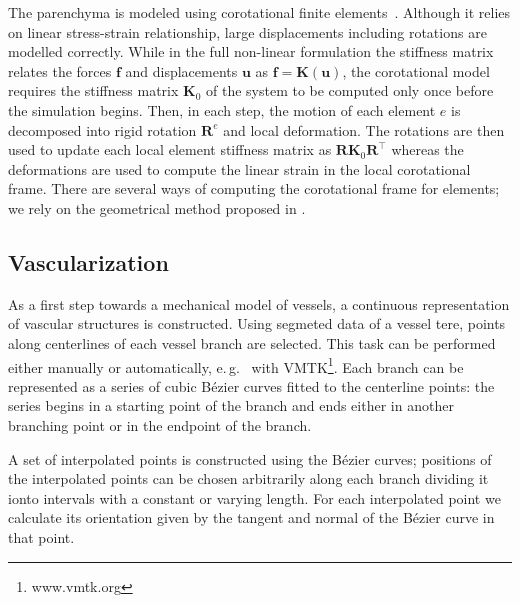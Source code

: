\documentclass[final,3p,times,twocolumn]{elsarticle}
\def\eg{e.\,g.\ }
\renewcommand{\Vec}[1]{\boldsymbol{#1}}
\newcommand{\Mat}[1]{\boldsymbol{#1}}
\begin{document}
The parenchyma is modeled using corotational finite elements~\cite{Felippa2005}.
Although it relies on linear stress-strain relationship, large displacements including rotations are modelled correctly. 
While in the full non-linear formulation the stiffness matrix relates the forces $\Vec{f}$ and 
displacements $\Vec{u}$ as $\Vec{f} = \Mat{K}(\Vec{u})$, the corotational model 
requires the stiffness matrix $\Mat{K}_0$ of the system to be computed only once before the simulation begins. 
Then, in each step, the motion of each element $e$ is decomposed into rigid rotation $\Mat{R}^e$ and local deformation. 
The rotations are then used to update each local element stiffness matrix as $\Mat{R}\Mat{K}_0\Mat{R}^{\top}$
whereas the deformations are used to compute the linear strain in the local corotational frame.
There are several ways of computing the corotational frame for elements; we rely on
the geometrical method proposed in \cite{Nesme2005}.


\subsection{Vascularization} %

As a first step towards a mechanical model of vessels, a continuous
representation of vascular structures is constructed. Using segmeted data
of a vessel tere, points along centerlines of each vessel branch are
selected. This task can be performed either manually or automatically, \eg
with VMTK\footnote{www.vmtk.org}. Each branch can be represented as a
series of cubic B\'{e}zier curves fitted to the centerline points: the
series begins in a starting point of the branch and ends either in another
branching point or in the endpoint of the branch.

A set of interpolated points is constructed using the B\'{e}zier curves;
positions of the interpolated points can be chosen arbitrarily along each
branch dividing it ionto intervals with a constant or varying length. For
each interpolated point we calculate its orientation given by the tangent
and normal of the B\'{e}zier curve in that point.
\end{document}
